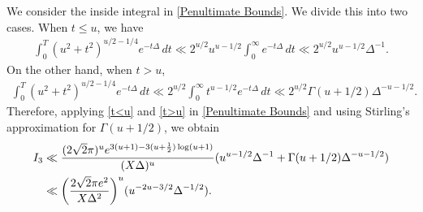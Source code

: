 \documentclass[11pt]{amsart}
\numberwithin{equation}{section}
\numberwithin{figure}{section}
\theoremstyle{definition}
\begin{document}
We consider the inside integral in \eqref{Penultimate Bounds}. We divide this into two cases. When $t \leqslant u$, we have
\begin{align}\label{t<u}
\int_{0}^{T} (u^2+t^2 )^{u/2-1/4} e^{-t \Delta} \,dt \ll 2^{u/2}u^{u-1/2} \int_{0}^{\infty} e^{-t \Delta} \,dt \ll 2^{u/2}u^{u-1/2} \Delta^{-1}.
\end{align} 
On the other hand, when $t>u$,
\begin{align}\label{t>u}
\int_{0}^{T} (u^2+t^2 )^{u/2-1/4} e^{-t \Delta} \,dt \ll 2^{u/2} \int_{0}^{\infty} t^{u-1/2} e^{-t \Delta} \,dt \ll  2^{u/2}\Gamma(u+1/2)\Delta^{-u-1/2}.
\end{align} 
Therefore, applying \eqref{t<u} and \eqref{t>u} in \eqref{Penultimate Bounds} and using Stirling's approximation for $\Gamma(u+1/2)$,  we obtain
\begin{align}
I_3 &\ll \frac{(2\sqrt{2}\pi)^{u}e^{3(u+1) - 3(u+\frac{1}{2})\log (u+1)}}{ (X \Delta)^{u}}  (u^{u-1/2} \Delta^{-1}+ \Gamma(u+1/2)\Delta^{-u-1/2})\notag \\
&\ll \bigg (\frac{2\sqrt{2}\pi e^2}{X\Delta^2} \bigg)^{u}( u^{-2u-3/2} \Delta^{-1/2}). \label{I3 Bound}
\end{align}
\end{document}

